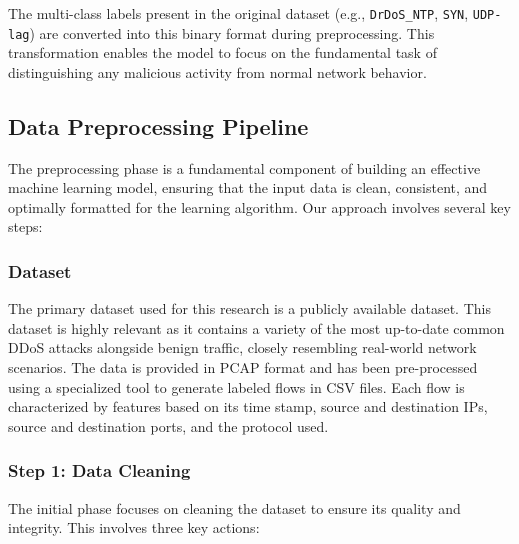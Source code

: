 \documentclass{report}
\begin{document}
The multi-class labels present in the original dataset (e.g., \texttt{DrDoS\_NTP}, \texttt{SYN}, \texttt{UDP-lag}) are converted into this binary format during preprocessing. This transformation enables the model to focus on the fundamental task of distinguishing any malicious activity from normal network behavior.


\subsection{Data Preprocessing Pipeline}

The preprocessing phase is a fundamental component of building an effective machine learning model, ensuring that the input data is clean, consistent, and optimally formatted for the learning algorithm. Our approach involves several key steps:

\subsubsection{Dataset}

The primary dataset used for this research is a publicly available dataset. This dataset is highly relevant as it contains a variety of the most up-to-date common DDoS attacks alongside benign traffic, closely resembling real-world network scenarios. The data is provided in PCAP format and has been pre-processed using a specialized tool to generate labeled flows in CSV files. Each flow is characterized by features based on its time stamp, source and destination IPs, source and destination ports, and the protocol used.

\subsubsection{Step 1: Data Cleaning}
The initial phase focuses on cleaning the dataset to ensure its quality and integrity. This involves three key actions:
\end{document}
